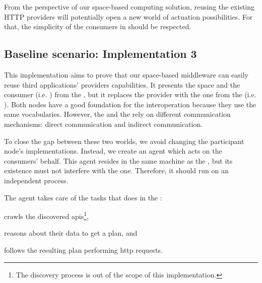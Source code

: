 From the perspective of our space-based computing solution, reusing the existing HTTP providers will potentially open a new world of actuation possibilities.
For that, the simplicity of the consumers in \spaceActuation{} should be respected. %




\subsection{Baseline scenario: Implementation 3}
\label{sec:actuation_scn3}
\newcommand{\implMix}{\emph{Implementation 3}}

This implementation aims to prove that our space-based middleware can easily reuse third applications' providers capabilities. %
It presents the space and the consumer (i.e. \nodeConsSpace{}) from the \implSpace{}, but it replaces the provider with the one from the \implRest{} (i.e. \nodeProvRest{}).
Both nodes have a good foundation for the interoperation because they use the same vocabularies. %
However, the \nodeProvRest{} and the \nodeConsSpace{} rely on different communication mechanisms: direct communication and indirect communication.


To close the gap between these two worlds, we avoid changing the participant node's implementations.
Instead, we create an agent which acts on the consumers' behalf. %
This agent resides in the same machine as the \Space{}, but its existence must not interfere with the \Space{} one. %
Therefore, it should run on an independent process.


The agent takes care of the tasks that \nodeConsRest{} does in the \implRest:
\begin{enumerate*}[label=\itshape(\arabic*\upshape)]
  \item crawls the discovered \acsp{api}\footnote{The discovery process is out of the scope of this implementation.},
  \item reasons about their data to get a plan, and
  \item follows the resulting plan performing \acs{http} requests.
\end{enumerate*}


